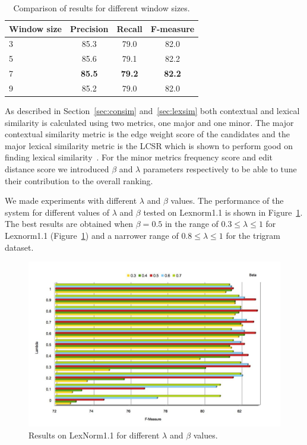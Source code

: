 \documentclass[a4paper,onesided,12pt]{report}
\begin{document}
\begin{table}[htb]
  \caption{Comparison of results for different window sizes.}
  \centering
  \begin{tabular}[th]{|l|c|c|c|}
    \hline
    \textbf{Window size} & \textbf{Precision} & \textbf{Recall} & \textbf{F-measure} \\
    \hline
    3 & 85.3 & 79.0 & 82.0 \\\hline
    5 & 85.6 & 79.1 & 82.2 \\\hline
    7 & \textbf{85.5} &  \textbf{79.2} &  \textbf{82.2} \\\hline
    9 & 85.2 & 79.0  & 82.0 \\\hline
  \end{tabular}
\label{tab:windows}
\end{table}

As described in Section~\ref{sec:consim} and~\ref{sec:lexsim} both contextual and lexical similarity is calculated using two metrics, one major and one minor. The major contextual similarity metric is the edge weight score of the candidates and the major lexical similarity metric is the LCSR which is shown to perform good on finding lexical similarity~\cite{Han:2011:LNS:2002472.2002520,DBLP:conf/acl/HassanM13}. For the minor metrics frequency score and edit distance score we introduced $\beta$ and $\lambda$ parameters respectively to be able to tune their contribution to the overall ranking.

We made experiments with different $\lambda$ and $\beta$ values. The performance of the system for different values of $\lambda$ and $\beta$ tested on Lexnorm1.1 is shown in Figure~\ref{fig:lambeta}. The best results are obtained when $\beta = 0.5$ in the range of  $0.3 \leq \lambda \leq 1$ for Lexnorm1.1 (Figure~\ref{fig:lambeta}) and a narrower range of $0.8 \leq \lambda \leq 1$ for the trigram dataset.

\begin{figure}[htb]
\begin{center}
\includegraphics[width=\linewidth]{fig/lambdasandbetas}
\caption{Results on LexNorm1.1 for different $\lambda$ and $\beta$ values.}
\label{fig:lambeta}
\end{center}
\end{figure}
\end{document}
